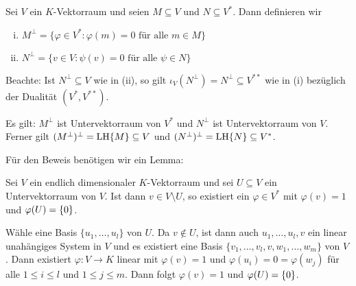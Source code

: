 \begin{definition}
	\label{def:12.13}
	Sei $V$ ein $K$-Vektorraum und seien $M \subseteq V$ und $N \subseteq V^*$.
	Dann definieren wir
	\begin{enumerate}[(i)]
		\item $M^\perp = \{ \varphi \in V^* : \varphi(m) = 0 \text{ für alle } m \in M\}$
		\item $N^\perp = \{ v \in V : \psi(v) = 0 \text{ für alle } \psi \in N\}$
	\end{enumerate}
\end{definition}

Beachte: Ist $N^\perp \subseteq V$ wie in (ii), so gilt $\iota_V(N^\perp) = N^\perp \subseteq V^{**}$ wie in (i) bezüglich der Dualität $(V^*,V^{**})$.

\begin{satz}
	\label{satz:12.14}
	Es gilt: $M^\perp$ ist Untervektorraum von $V^*$ und $N^\perp$ ist Untervektorraum von $V$.
	Ferner gilt $(M^\perp)^\perp = \operatorname{LH}\{M\} \subseteq V$ und $(N^\perp)^\perp = \operatorname{LH}\{N\} \subseteq V^*$.
\end{satz}

Für den Beweis benötigen wir ein Lemma:

\begin{lemma}
	\label{lemma:12.15}
	Sei $V$ ein endlich dimensionaler $K$-Vektorraum und sei $U \subseteq V$ ein Untervektorraum von $V$.
	Ist dann $v \in V \setminus U$, so existiert ein $\varphi \in V^*$ mit $\varphi(v) =1$ und $\varphi(U) = \{0\}$.
\end{lemma}

\begin{beweis}
	Wähle eine Basis $\{u_1,\dots,u_l\}$ von $U$.
	Da $v \notin U$, ist dann auch $u_1,\dots,u_l,v$ ein linear unahängiges System in $V$ und es existiert eine Basis $\{v_1,\dots,v_l,v,w_1,\dots,w_m\}$ von $V$.
	Dann existiert $\varphi \colon V \rightarrow K$ linear mit $\varphi(v) = 1$ und $\varphi(u_i) = 0 = \varphi(w_j)$ für alle $1 \leq i \leq l$ und $1 \leq j \leq m$.
	Dann folgt $\varphi(v) = 1$ und $\varphi(U) = \{0\}$. \qedhere
\end{beweis}

